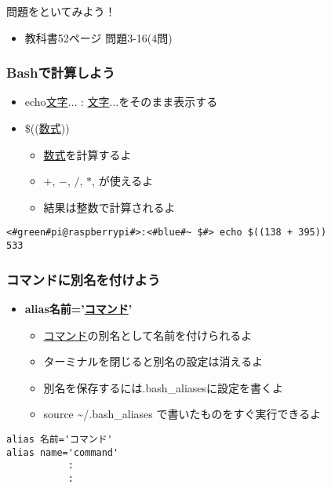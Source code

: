 \begin{frame}
    \begin{exampleblock}{問題をといてみよう！}
        \begin{itemize}
            \item 教科書52ページ 問題3-16(4問)
        \end{itemize}
    \end{exampleblock} 
\end{frame}

\begin{frame}[fragile]
    \frametitle{Bashで計算しよう}
    \begin{itemize}
        \item echo\textvisiblespace\underline{文字}$\ldots$ : \underline{文字}$\ldots$をそのまま表示する
        \item \$((\underline{数式}))
        \begin{itemize}
            \small
            \item \underline{数式}を計算するよ
            \item $+$, $-$, $/$, $*$, が使えるよ 
            \item 結果は整数で計算されるよ
        \end{itemize}
    \end{itemize}
    \begin{lstlisting}[title=echo コマンドでの計算, label=cmdsbs:calc]
<#green#pi@raspberrypi#>:<#blue#~ $#> echo $((138 + 395))
533
    \end{lstlisting}
\end{frame}

\begin{frame}[fragile]
    \frametitle{コマンドに別名を付けよう}
    \begin{itemize}
        \item {\bf alias\textvisiblespace 名前='\underline{コマンド}'}
        \begin{itemize}
            \small
            \item \underline{コマンド}の別名として名前を付けられるよ
            \item ターミナルを閉じると別名の設定は消えるよ
            \item 別名を保存するには.bash\_aliasesに設定を書くよ
            \item source \sim/.bash\_aliases で書いたものをすぐ実行できるよ
        \end{itemize}
    \end{itemize}
    \begin{lstlisting}[title=\textasciitilde/.bash\_aliasesの書き方, label=bashAliasesGrammar1]
alias 名前='コマンド'
alias name='command'
           :
           :
    \end{lstlisting}
\end{frame}

